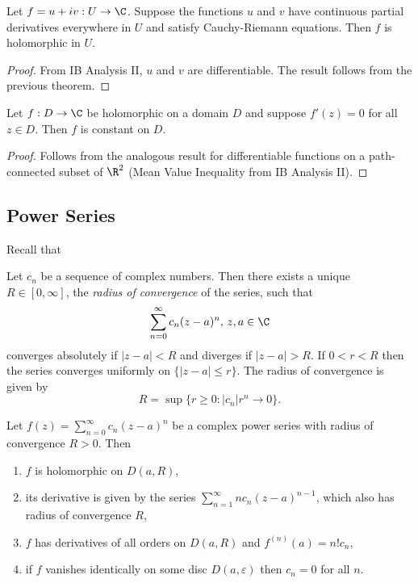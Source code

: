\documentclass[a4paper]{article}
\begin{document}
\begin{corollary}
  Let \(f = u + iv: U \to \C\). Suppose the functions \(u\) and \(v\) have continuous partial derivatives everywhere in \(U\) and satisfy Cauchy-Riemann equations. Then \(f\) is holomorphic in \(U\).
\end{corollary}

\begin{proof}
  From IB Analysis II, \(u\) and \(v\) are differentiable. The result follows from the previous theorem.
\end{proof}

\begin{corollary}
  Let \(f: D \to \C\) be holomorphic on a domain \(D\) and suppose \(f'(z) = 0\) for all \(z \in D\). Then \(f\) is constant on \(D\).
\end{corollary}

\begin{proof}
  Follows from the analogous result for differentiable functions on a path-connected subset of \(\R^2\) (Mean Value Inequality from IB Analysis II).
\end{proof}

\subsection{Power Series}

Recall that

\begin{theorem}
  Let \(c_n\) be a sequence of complex numbers. Then there exists a unique \(R \in [0, \infty]\), the \emph{radius of convergence} of the series, such that
  \[
    \sum_{n = 0}^\infty c_n(z - a)^n,\, z, a \in \C
  \]
  converges absolutely if \(|z - a| < R\) and diverges if \(|z - a| > R\). If \(0 < r < R\) then the series converges uniformly on \(\{|z - a| \leq r\}\). The radius of convergence is given by
  \[
    R = \sup\{r \geq 0: |c_n|r^n \to 0\}.
  \]
\end{theorem}

\begin{theorem}
  Let \(f(z) = \sum_{n = 0}^\infty c_n(z - a)^n\) be a complex power series with radius of convergence \(R > 0\). Then
  \begin{enumerate}
  \item \(f\) is holomorphic on \(D(a, R)\),
  \item its derivative is given by the series \(\sum_{n = 1}^\infty nc_n(z - a)^{n - 1}\), which also has radius of convergence \(R\),
  \item \(f\) has derivatives of all orders on \(D(a, R)\) and \(f^{(n)}(a) = n!c_n\),
  \item if \(f\) vanishes identically on some disc \(D(a, \varepsilon)\) then \(c_n = 0\) for all \(n\).
  \end{enumerate}
\end{theorem}
\end{document}
